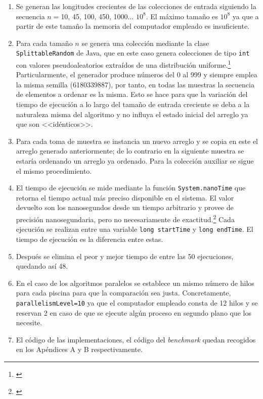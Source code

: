 \documentclass[titlepage]{article}
\begin{document}
\begin{enumerate}
	\item Se generan las longitudes crecientes de las colecciones de entrada siguiendo la secuencia $n=$10, 45, 100, 450, 1000... $10^8$. El máximo tamaño es $10^8$ ya que a partir de este tamaño la memoria del computador empleado es insuficiente.
	\item Para cada tamaño $n$ se genera una colección mediante la clase \lstinline|SplittableRandom| de Java, que en este caso genera colecciones de tipo \lstinline|int| con valores pseudoaleatorios extraídos de una distribución uniforme.\footnote{\cite{OracleSplittableRandom}} Particularmente, el generador produce números del 0 al 999 y siempre emplea la misma semilla (6180339887), por tanto, en todas las muestras la secuencia de elementos a ordenar es la misma. Esto se hace para que la variación del tiempo de ejecución a lo largo del tamaño de entrada creciente se deba a la naturaleza misma del algoritmo y no influya el estado inicial del arreglo ya que son <<idénticos>>.
	\item Para cada toma de muestra se instancia un nuevo arreglo y se copia en este el arreglo generado anteriormente; de lo contrario en la siguiente muestra se estaría ordenando un arreglo ya ordenado. Para la colección auxiliar se sigue el mismo procedimiento.
	\item El tiempo de ejecución se mide mediante la función \lstinline|System.nanoTime| que retorna el tiempo actual más preciso disponible en el sistema. El valor devuelto son los nanosegundos desde un tiempo arbitrario y provee de precisión nanosegundaria, pero no necesariamente de exactitud.\footnote{\cite{OracleSystem}} Cada ejecución se realizan entre una variable \lstinline|long startTime| y \lstinline|long endTime|. El tiempo de ejecución es la diferencia entre estas.
	\item Después se elimina el peor y mejor tiempo de entre las 50 ejecuciones, quedando así 48.
	\item En el caso de los algoritmos paralelos se establece un mismo número de hilos para cada piscina para que la comparación sea justa. Concretamente, \lstinline|parallelismLevel=10| ya que el computador empleado consta de 12 hilos y se reservan 2 en caso de que se ejecute algún proceso en segundo plano que los necesite. 
	\item El código de las implementaciones, el código del \textit{benchmark} quedan recogidos en los Apéndices A y B respectivamente.
	
\end{enumerate}
\end{document}
